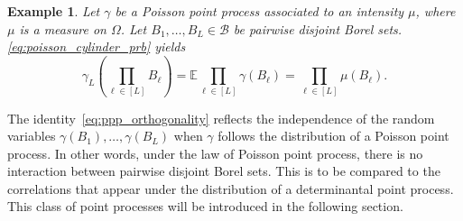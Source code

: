 \documentclass[twoside,11pt]{book}
\newtheorem{example}{Example}
\numberwithin{theorem}{chapter}
\numberwithin{definition}{chapter}
\numberwithin{proposition}{chapter}
\numberwithin{corollary}{chapter}
\numberwithin{example}{chapter}
\numberwithin{lemma}{chapter}
\numberwithin{assumption}{chapter}
\begin{document}














\begin{example}
Let $\gamma$ be a Poisson point process associated to an intensity $\mu$, where $\mu$ is a measure on $\Omega$. Let $B_{1}, \dots, B_{L} \in \mathcal{B}$ be pairwise disjoint Borel sets. \eqref{eq:poisson_cylinder_prb} yields
\begin{equation}\label{eq:ppp_orthogonality}
\gamma_{L}(\prod\limits_{\ell \in [L]} B_\ell) =  \mathbb{E} \prod\limits_{\ell \in [L]} \gamma(B_\ell) = \prod\limits_{\ell \in [L]}\mu(B_\ell).
\end{equation}
\end{example}
The identity~\eqref{eq:ppp_orthogonality} reflects the independence of the random variables $\gamma(B_{1}), \dots, \gamma(B_L)$ when $\gamma$ follows the distribution of a Poisson point process. In other words, under the law of Poisson point process, there is no interaction between pairwise disjoint Borel sets.  This is to be compared to the correlations that appear under the distribution of a determinantal point process. This class of point processes will be introduced in the following section.
\end{document}
